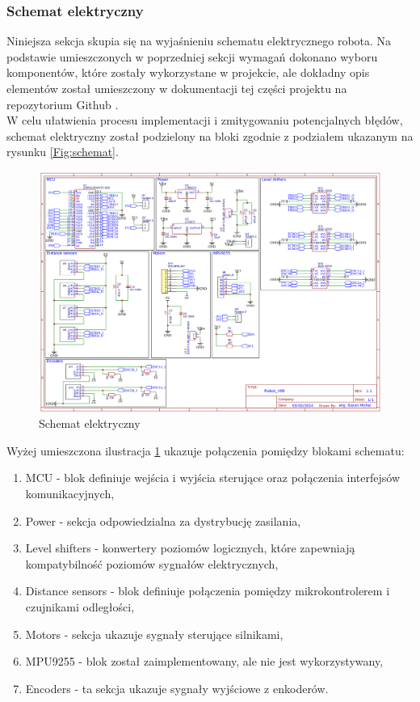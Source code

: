 \documentclass[12pt,twoside]{article}
\begin{document}
\newpage

\subsubsection{Schemat elektryczny}
Niniejsza sekcja skupia się na wyjaśnieniu schematu elektrycznego robota. 
Na podstawie umieszczonych w poprzedniej sekcji wymagań dokonano wyboru komponentów, które zostały wykorzystane w projekcie, ale dokładny opis elementów został umieszczony w dokumentacji tej części projektu na repozytorium Github \cite{repo}.\\
\newline
W celu ułatwienia procesu implementacji i zmitygowaniu potencjalnych błędów, schemat elektryczny został podzielony na bloki zgodnie z podziałem ukazanym na rysunku \ref{Fig:schemat}.



\begin{figure}[ht]%
 \centering%
 \includegraphics[width=12cm]{figures/engHW/robotschem.png}%
 \caption{Schemat elektryczny}%
 \label{Fig:elektryczny}%
\end{figure}

Wyżej umieszczona ilustracja \ref{Fig:elektryczny} ukazuje połączenia pomiędzy blokami schematu:

\begin{enumerate}[label=\alph*), leftmargin=1.25cm]
	\item MCU - blok definiuje wejścia i wyjścia sterujące oraz połączenia interfejsów komunikacyjnych,
	\item Power - sekcja odpowiedzialna za dystrybucję zasilania,
	\item Level shifters - konwertery poziomów logicznych, które zapewniają kompatybilność poziomów sygnałów elektrycznych,
	\item Distance sensors - blok definiuje połączenia pomiędzy mikrokontrolerem i czujnikami odległości,
	\item Motors - sekcja ukazuje sygnały sterujące silnikami,
	\item MPU9255 - blok został zaimplementowany, ale nie jest wykorzystywany,
	\item Encoders - ta sekcja ukazuje sygnały wyjściowe z enkoderów.
\end{enumerate}
\end{document}

